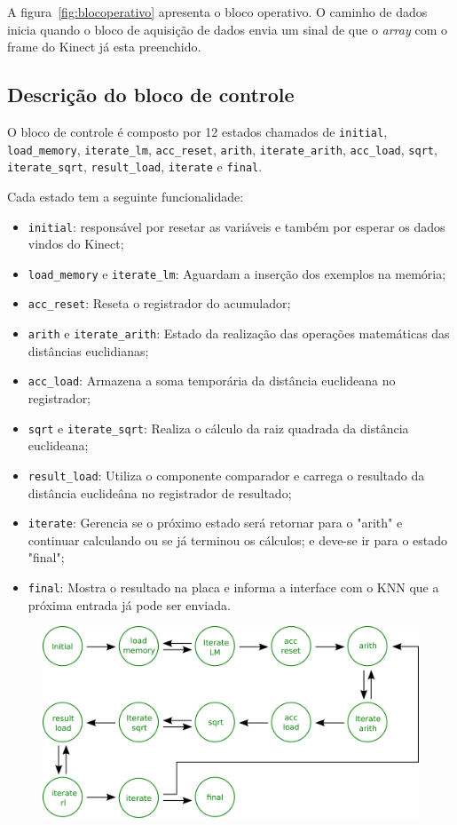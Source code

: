 \documentclass[12pt]{article}
\begin{document}
A figura~\ref{fig:blocoperativo} apresenta o bloco operativo. O caminho de
dados inicia quando o bloco de aquisição de dados envia um sinal de que o 
\textit{array} com o frame do Kinect já esta preenchido.


\subsection{Descrição do bloco de controle}

O bloco de controle é composto por 12 estados chamados de \verb|initial|,
\verb|load_memory|, \verb|iterate_lm|, \verb|acc_reset|,
\verb|arith|, \verb|iterate_arith|, \verb|acc_load|, \verb|sqrt|,
\verb|iterate_sqrt|, \verb|result_load|, \verb|iterate| e 
\verb|final|.

Cada estado tem a seguinte funcionalidade:

\begin{itemize}

\item \verb|initial|: responsável por resetar as variáveis e também por esperar os dados vindos do Kinect;
\item \verb|load_memory| e \verb|iterate_lm|: Aguardam a inserção dos exemplos na memória;
\item \verb|acc_reset|: Reseta o registrador do acumulador;
\item \verb|arith| e \verb|iterate_arith|: Estado da realização das operações matemáticas das distâncias euclidianas;
\item \verb|acc_load|: Armazena a soma temporária da distância euclideana no registrador;
\item \verb|sqrt| e \verb|iterate_sqrt|: Realiza o cálculo da raiz quadrada da distância euclideana;
\item \verb|result_load|: Utiliza o componente comparador e carrega o resultado da distância euclideâna no registrador de resultado;
\item \verb|iterate|: Gerencia se o próximo estado será retornar para o "arith" e continuar calculando ou se já terminou os cálculos;
e deve-se ir para o estado "final";
\item \verb|final|: Mostra o resultado na placa e informa a interface com o KNN que a próxima entrada já pode ser enviada.
\end{itemize}

\begin{figure}[!ht]
\centering
\includegraphics[scale=0.2]{img/control_unit.png}
\end{figure}
\end{document}
